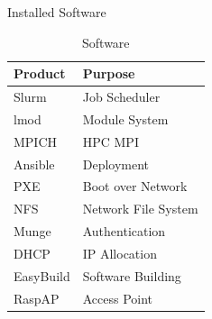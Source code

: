 \documentclass[final]{beamer}
\newlength{\sepwidth}
\newlength{\colwidth}
\newcommand{\separatorcolumn}{\begin{column}{\sepwidth}\end{column}}
\begin{document}
\begin{frame}[t]
\begin{columns}[t]
\begin{column}{\colwidth}
				\begin{block}{Installed Software}
					\begin{table}

						\parbox{.45\linewidth}{
							\centering
							\caption{Software}				
							\begin{tabular}{l|l}
								\textbf{Product} & {Purpose}\\
								\hline
								Slurm & Job Scheduler \\
								lmod & Module System \\
								MPICH & HPC MPI \\
								Ansible & Deployment \\
								PXE & Boot over Network \\
								NFS & Network File System \\
								Munge & Authentication \\
								DHCP & IP Allocation \\
								EasyBuild & Software Building \\
								RaspAP & Access Point \\
							\end{tabular}
						}
					\end{table}
				\end{block}	
			\end{column}			
			\separatorcolumn
		\end{columns}
	\end{frame}
	
\end{document}
